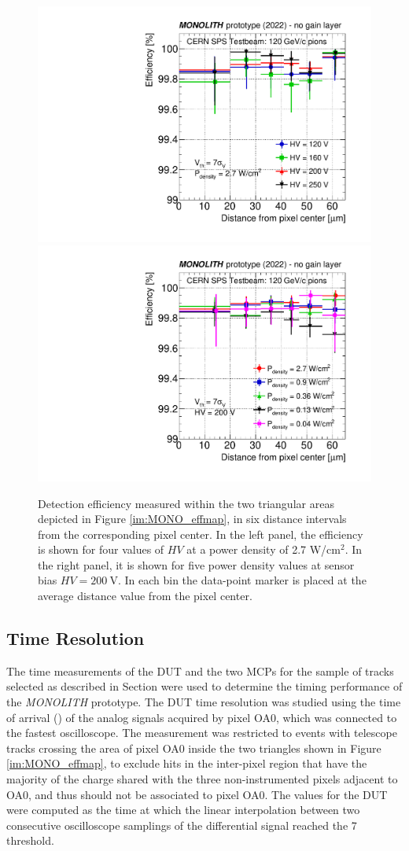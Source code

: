 		\begin{figure}[h]
			\centering 
			\includegraphics[width=.49\textwidth,trim=0 0 0 0]{files/MONOLITH_paper/eff_vs_radius_HV.pdf}
			\includegraphics[width=.49\textwidth,trim=0 0 0 0]{files/MONOLITH_paper/eff_vs_radius_power.pdf}
			\caption{Detection efficiency measured within the two triangular areas depicted in Figure \ref{im:MONO_effmap}, in six distance intervals from the corresponding pixel center. In the left panel, the  efficiency is shown for four values of $HV$ at a power density of 2.7 W/cm$^2$. In the right panel, it is shown for five power density values at sensor bias $HV=\SI{200}{\volt}$.  In each bin the data-point marker is placed at the average distance value from the pixel center.}
			\label{im:MONO_eff_radius} 
		\end{figure}













		\subsection{Time Resolution}	

		The time measurements of the DUT and the two MCPs for the sample of tracks selected as described in Section  were used to determine the timing performance of the \textit{MONOLITH} prototype. 
		The DUT time resolution was studied using the time of arrival (\toa) of the  analog signals acquired by pixel OA0, which was connected to the fastest oscilloscope. The measurement was restricted to events with telescope tracks crossing the area of pixel OA0 inside the two triangles shown in Figure \ref{im:MONO_effmap}, to exclude hits in the inter-pixel region that have the majority of the charge shared with the three non-instrumented pixels adjacent to OA0, and thus should not be associated to pixel OA0. 
		The \toa values for the DUT were computed as the time at which the linear interpolation between two consecutive oscilloscope samplings of the differential signal reached the 7 \noise threshold. 
		
